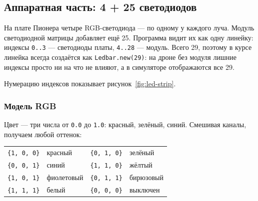 \subsection{Аппаратная часть: 4 + 25 светодиодов}

На плате Пионера четыре RGB-светодиода --- по одному у каждого луча. Модуль светодиодной матрицы добавляет ещё 25. Программа видит их как одну линейку: индексы \verb|0..3| --- светодиоды платы, \verb|4..28| --- модуль. Всего 29, поэтому в курсе линейка всегда создаётся как \verb|Ledbar.new(29)|: на дроне без модуля лишние индексы просто ни на что не влияют, а в симуляторе отображаются все 29.

Нумерацию индексов показывает рисунок~\ref{fig:led-strip}.



\begin{center}
\end{center}

\subsubsection*{Модель RGB}

Цвет --- три числа от \verb|0.0| до \verb|1.0|: красный, зелёный, синий. Смешивая каналы, получаем любой оттенок:

\begin{center}
\small
\begin{tabular}{@{}ll@{\qquad}ll@{}}
\toprule
\verb|{1, 0, 0}| & красный & \verb|{0, 1, 0}| & зелёный \\
\verb|{0, 0, 1}| & синий & \verb|{1, 1, 0}| & жёлтый \\
\verb|{1, 0, 1}| & фиолетовый & \verb|{0, 1, 1}| & бирюзовый \\
\verb|{1, 1, 1}| & белый & \verb|{0, 0, 0}| & выключен \\
\bottomrule
\end{tabular}
\end{center}

